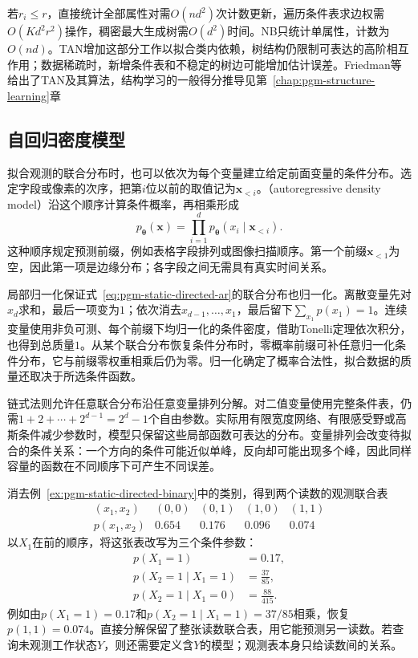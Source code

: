 若$r_i\le r$，直接统计全部属性对需$O(nd^2)$次计数更新，遍历条件表求边权需$O(Kd^2r^2)$操作，稠密最大生成树需$O(d^2)$时间。NB只统计单属性，计数为$O(nd)$。TAN增加这部分工作以拟合类内依赖，树结构仍限制可表达的高阶相互作用；数据稀疏时，新增条件表和不稳定的树边可能增加估计误差。Friedman等给出了TAN及其算法，结构学习的一般得分推导见第~\ref{chap:pgm-structure-learning}章

\subsection{自回归密度模型}
\label{sec:pgm-static-directed-autoregressive}

拟合观测的联合分布时，也可以依次为每个变量建立给定前面变量的条件分布。选定字段或像素的次序，把第$i$位以前的取值记为$\bm x_{<i}$。（autoregressive density model）沿这个顺序计算条件概率，再相乘形成
\begin{equation}
  \label{eq:pgm-static-directed-ar}
  p_{\bm{\theta}}(\bm{x})
    =\prod_{i=1}^{d}p_{\bm{\theta}}(x_i\mid\bm{x}_{<i}).
\end{equation}
这种顺序规定预测前缀，例如表格字段排列或图像扫描顺序。第一个前缀$\bm x_{<1}$为空，因此第一项是边缘分布；各字段之间无需具有真实时间关系。

局部归一化保证式~\eqref{eq:pgm-static-directed-ar}的联合分布也归一化。离散变量先对$x_d$求和，最后一项变为$1$；依次消去$x_{d-1},\ldots,x_1$，最后留下$\sum_{x_1}p(x_1)=1$。连续变量使用非负可测、每个前缀下均归一化的条件密度，借助Tonelli定理依次积分，也得到总质量$1$。从某个联合分布恢复条件分布时，零概率前缀可补任意归一化条件分布，它与前缀零权重相乘后仍为零。归一化确定了概率合法性，拟合数据的质量还取决于所选条件函数。

链式法则允许任意联合分布沿任意变量排列分解。对二值变量使用完整条件表，仍需$1+2+\cdots+2^{d-1}=2^d-1$个自由参数。实际用有限宽度网络、有限感受野或高斯条件减少参数时，模型只保留这些局部函数可表达的分布。变量排列会改变待拟合的条件关系：一个方向的条件可能近似单峰，反向却可能出现多个峰，因此同样容量的函数在不同顺序下可产生不同误差。

消去例~\ref{ex:pgm-static-directed-binary}中的类别，得到两个读数的观测联合表
\[
  \begin{array}{ccccc}
    (x_1,x_2)&(0,0)&(0,1)&(1,0)&(1,1)\\
    p(x_1,x_2)&0.654&0.176&0.096&0.074
  \end{array}
\]
以$X_1$在前的顺序，将这张表改写为三个条件参数：
\[
  \begin{aligned}
    p(X_1=1)&=0.17,\\
    p(X_2=1\mid X_1=1)&=\frac{37}{85},\\
    p(X_2=1\mid X_1=0)&=\frac{88}{415}.
  \end{aligned}
\]
例如由$p(X_1=1)=0.17$和$p(X_2=1\mid X_1=1)=37/85$相乘，恢复$p(1,1)=0.074$。直接分解保留了整张读数联合表，用它能预测另一读数。若查询未观测工作状态$Y$，则还需要定义含$Y$的模型；观测表本身只给读数间的关系。

